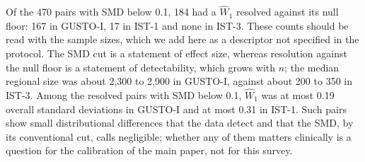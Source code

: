 \documentclass[11pt]{article}
\begin{document}
Of the 470 pairs with SMD below 0.1, 184 had a $\widehat{W}_1$ resolved against its null floor: 167 in GUSTO-I, 17 in IST-1 and none in IST-3. These counts should be read with the sample sizes, which we add here as a descriptor not specified in the protocol. The SMD cut is a statement of effect size, whereas resolution against the null floor is a statement of detectability, which grows with $n$; the median regional size was about 2,300 to 2,900 in GUSTO-I, against about 200 to 350 in IST-3. Among the resolved pairs with SMD below 0.1, $\widehat{W}_1$ was at most 0.19 overall standard deviations in GUSTO-I and at most 0.31 in IST-1. Such pairs show small distributional differences that the data detect and that the SMD, by its conventional cut, calls negligible; whether any of them matters clinically is a question for the calibration of the main paper, not for this survey.



\end{document}
